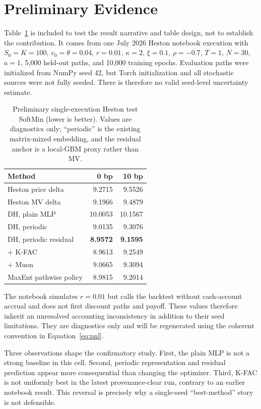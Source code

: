 \documentclass[sigconf,balance=false]{acmart}
\begin{document}
\section{Preliminary Evidence}
\label{sec:preliminary}

Table~\ref{tab:preliminary} is included to test the result narrative and table
design, not to establish the contribution.  It comes from one July 2026 Heston
notebook execution with $S_0=K=100$, $v_0=\theta=0.04$, $r=0.01$,
$\kappa=2$, $\xi=0.1$, $\rho=-0.7$, $T=1$, $N=30$, $a=1$, 5,000 held-out
paths, and 10,000 training epochs.  Evaluation paths were initialized from
NumPy seed 42, but Torch initialization and all stochastic sources were not
fully seeded.  There is therefore no valid seed-level uncertainty estimate.

\begin{table}[t]
  \caption{Preliminary single-execution Heston test SoftMin (lower is better).
  Values are diagnostics only; ``periodic'' is the existing matrix-mixed
  embedding, and the residual anchor is a local-GBM proxy rather than MV.}
  \label{tab:preliminary}
  \small
  \begin{tabular}{@{}lrr@{}}
    \toprule
    Method & 0 bp & 10 bp \\
    \midrule
    Heston price delta & 9.2715 & 9.5526 \\
    Heston MV delta & 9.1966 & 9.4879 \\
    DH, plain MLP & 10.0053 & 10.1567 \\
    DH, periodic & 9.0135 & 9.3076 \\
    DH, periodic residual & \textbf{8.9572} & \textbf{9.1595} \\
    \quad{}+ K-FAC & 8.9613 & 9.2549 \\
    \quad{}+ Muon & 9.0665 & 9.3094 \\
    MaxEnt pathwise policy & 8.9815 & 9.2014 \\
    \bottomrule
  \end{tabular}
\end{table}

The notebook simulates $r=0.01$ but calls the backtest without cash-account
accrual and does not first discount paths and payoff.  These values therefore
inherit an unresolved accounting inconsistency in addition to their seed
limitations.  They are diagnostics only and will be regenerated using the
coherent convention in Equation~\eqref{eq:pnl}.

Three observations shape the confirmatory study.  First, the plain MLP is not a
strong baseline in this cell.  Second, periodic representation and residual
prediction appear more consequential than changing the optimizer.  Third,
K-FAC is not uniformly best in the latest provenance-clear run, contrary to an
earlier notebook result.  This reversal is precisely why a single-seed
``best-method'' story is not defensible.
\end{document}
